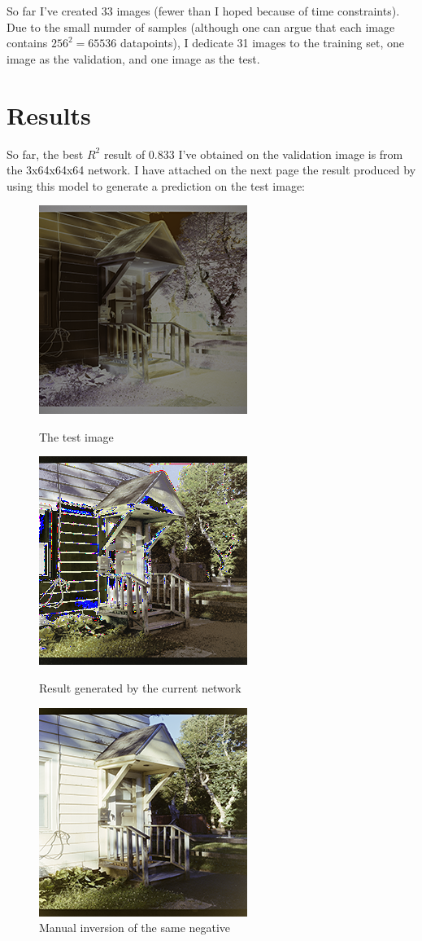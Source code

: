 \documentclass[twoside,11pt]{article}
\begin{document}
So far I've created 33 images (fewer than I hoped because of time constraints). Due to the small numder of samples
(although one can argue that each image contains $256^2=65536$ datapoints), I dedicate 31 images to the training set,
 one image as the validation, and one image as the test.


\section{Results}
\label{sec:results}
So far, the best $R^2$ result of $0.833$ I've obtained on the validation image is from the 3x64x64x64 network. 
I have attached on the next page the result produced by using this model to generate a prediction on the test image:

\begin{figure}
	\centering
	\includegraphics[width=0.4\linewidth]{test.png}
	\caption{The test image}
	\includegraphics[width=0.4\linewidth]{res.png}
	\caption{Result generated by the current network}
	\includegraphics[width=0.4\linewidth]{expected.png}
	\caption{Manual inversion of the same negative}
	\label{fig:test}
\end{figure}
\end{document}
